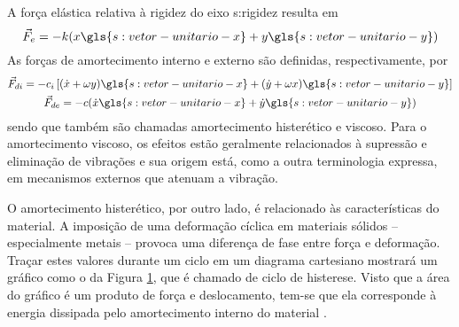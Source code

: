 \documentclass[12pt,oneside,english,brazil,lmodern,siglas,simbolos,cite=num]{ucsmonograph}
\begin{document}
	A força elástica relativa à rigidez do eixo \gls{s:rigidez} resulta em \cite{rao:2008}
	\begin{equation}\label{eqn:rotores:forca-elastica}
		\vec{F}_e = -k(x\gls{s:vetor-unitario-x} + y\gls{s:vetor-unitario-y})
	\end{equation}
	As forças de amortecimento interno e externo são definidas, respectivamente, por \cite{rao:2008}
	\begin{gather}
		\vec{F}_{di} = -c_i\left[(\dot{x} + \omega y)\gls{s:vetor-unitario-x} +
		(\dot{y} + \omega x)\gls{s:vetor-unitario-y} \right] \label{eqn:rotores:forca-amort-interno} \\
		\vec{F}_{de} = -c(\dot{x}\gls{s:vetor-unitario-x} + \dot{y}\gls{s:vetor-unitario-y}) \label{eqn:rotores:forca-amort-externo}
	\end{gather}
	sendo que também são chamadas amortecimento histerético e viscoso.
	Para o amortecimento viscoso, os efeitos estão geralmente relacionados à supressão e eliminação de vibrações \cite{dimarogonas:1995} e sua origem está, como a outra terminologia expressa, em mecanismos externos que atenuam a vibração.
	
	O amortecimento histerético, por outro lado, é relacionado às características do material.
	A imposição de uma deformação cíclica em materiais sólidos -- especialmente metais -- provoca uma diferença de fase entre força e deformação.
	Traçar estes valores durante um ciclo em um diagrama cartesiano mostrará um gráfico como o da Figura \ref{fig:histerese}, que é chamado de ciclo de histerese.
	Visto que a área do gráfico é um produto de força e deslocamento, tem-se que ela corresponde à energia dissipada pelo amortecimento interno do material \cite{dimarogonas:1995}.
	
	\begin{figure}[b]
		\label{fig:histerese}
	\end{figure}
\end{document}
